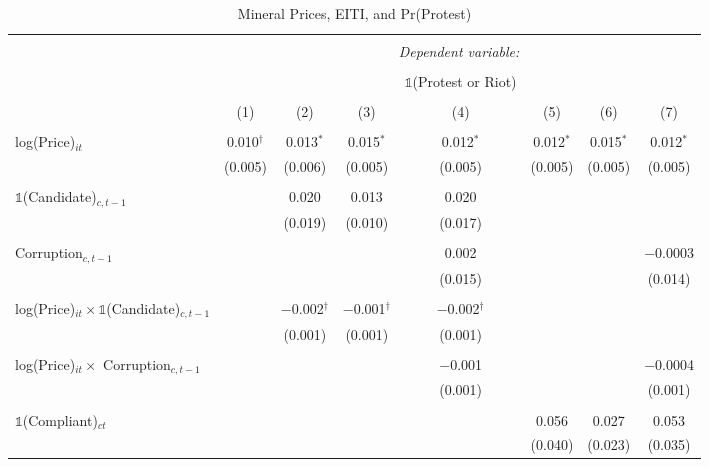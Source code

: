 
\begin{table}[ht!] \centering 
  \caption{Mineral Prices, EITI, and Pr(Protest)} 
  \label{tab:did_price_acled_eiti} 
\begin{tabular}{@{\extracolsep{0pt}}lccccccc} 
\\[-1.8ex]\hline 
\hline \\[-1.8ex] 
 & \multicolumn{7}{c}{\textit{Dependent variable:}} \\ 
\cline{2-8} 
\\[-1.8ex] &  &  &  & $\mathbb{1}$(Protest or Riot) &  &  &  \\ 
\\[-1.8ex] & (1) & (2) & (3) & (4) & (5) & (6) & (7)\\ 
\hline \\[-1.8ex] 
 log(Price)$_{it}$ & 0.010$^{\dagger}$ & 0.013$^{*}$ & 0.015$^{*}$ & 0.012$^{*}$ & 0.012$^{*}$ & 0.015$^{*}$ & 0.012$^{*}$ \\ 
  & (0.005) & (0.006) & (0.005) & (0.005) & (0.005) & (0.005) & (0.005) \\ 
  & & & & & & & \\ 
 $\mathbb{1}$(Candidate)$_{c, t - 1}$ &  & 0.020 & 0.013 & 0.020 &  &  &  \\ 
  &  & (0.019) & (0.010) & (0.017) &  &  &  \\ 
  & & & & & & & \\ 
 Corruption$_{c, t - 1}$ &  &  &  & 0.002 &  &  & $-$0.0003 \\ 
  &  &  &  & (0.015) &  &  & (0.014) \\ 
  & & & & & & & \\ 
 log(Price)$_{it} \times \mathbb{1}$(Candidate)$_{c,t - 1}$ &  & $-$0.002$^{\dagger}$ & $-$0.001$^{\dagger}$ & $-$0.002$^{\dagger}$ &  &  &  \\ 
  &  & (0.001) & (0.001) & (0.001) &  &  &  \\ 
  & & & & & & & \\ 
 log(Price)$_{it} \times$ Corruption$_{c, t - 1}$ &  &  &  & $-$0.001 &  &  & $-$0.0004 \\ 
  &  &  &  & (0.001) &  &  & (0.001) \\ 
  & & & & & & & \\ 
 $\mathbb{1}$(Compliant)$_{ct}$ &  &  &  &  & 0.056 & 0.027 & 0.053 \\ 
  &  &  &  &  & (0.040) & (0.023) & (0.035) \\ 

\end{tabular}
\end{table}
